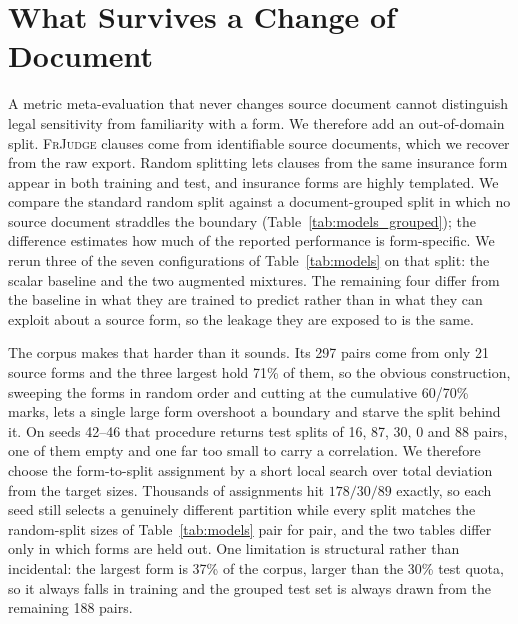 \documentclass[11pt]{article}
\begin{document}
\begin{table}[t]\centering\small
\resizebox{\columnwidth}{!}{}
\caption{Williams tests against the trivial length baseline
$\ell = -|\,|s|-|o|\,|$, which reaches $r=0.613$ with the human label $h$ over
all $297$ items. $r(m,\ell)$ is each metric's correlation with the length
feature itself, the dependence the test corrects for. Positive $t$ favours
$\ell$.}
\label{tab:significance}
\end{table}

\section{What Survives a Change of Document}
\label{app:grouped}

A metric meta-evaluation that never changes source document cannot distinguish
legal sensitivity from familiarity with a form. We therefore add an
out-of-domain split. \textsc{FrJudge} clauses come from identifiable source
documents, which we recover from the raw export. Random splitting lets clauses
from the same insurance form appear in both training and test, and insurance
forms are highly templated. We compare the standard random split against a
document-grouped split in which no source document straddles the boundary
(Table~\ref{tab:models_grouped}); the difference estimates how much of the
reported performance is form-specific. We rerun three of the seven
configurations of Table~\ref{tab:models} on that split: the scalar baseline and
the two augmented mixtures. The remaining four differ from the baseline in what
they are trained to predict rather than in what they can exploit about a source
form, so the leakage they are exposed to is the same.

The corpus makes that harder than it sounds. Its 297 pairs come from only 21
source forms and the three largest hold 71\% of them, so the obvious
construction, sweeping the forms in random order and cutting at the cumulative
60/70\% marks, lets a single large form overshoot a boundary and starve the
split behind it. On seeds 42--46 that procedure returns test splits of 16, 87,
30, 0 and 88 pairs, one of them empty and one far too small to carry a
correlation. We therefore choose the form-to-split assignment by a short local
search over total deviation from the target sizes. Thousands of assignments hit
$178/30/89$ exactly, so each seed still selects a genuinely different partition
while every split matches the random-split sizes of Table~\ref{tab:models} pair
for pair, and the two tables differ only in which forms are held out. One
limitation is structural rather than incidental: the largest form is 37\% of the
corpus, larger than the 30\% test quota, so it always falls in training and the
grouped test set is always drawn from the remaining 188 pairs.
\end{document}
